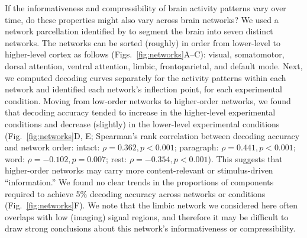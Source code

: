 \documentclass[english, 11pt]{article}
\begin{document}
If the informativeness and compressibility of brain activity patterns vary over
time, do these properties might also vary across brain networks? We used a
network parcellation identified by \cite{YeoEtal11} to segment the brain into
seven distinct networks. The networks can be sorted (roughly) in order from
lower-level to higher-level cortex as follows (Figs.~\ref{fig:networks}A--C):
visual, somatomotor, dorsal attention, ventral attention, limbic,
frontoparietal, and default mode. Next, we computed decoding curves separately
for the activity patterns within each network and identified each network's
inflection point, for each experimental condition. Moving from low-order
networks to higher-order networks, we found that decoding accuracy tended to
increase in the higher-level experimental conditions and decrease (slightly) in
the lower-level experimental conditions (Fig.~\ref{fig:networks}D, E;
Spearman's rank correlation between decoding accuracy and network order:
intact: $\rho = 0.362, p < 0.001$; paragraph: $\rho = 0.441, p < 0.001$; word:
$\rho = -0.102, p = 0.007$; rest: $\rho = -0.354, p < 0.001$). This suggests
that higher-order networks may carry more content-relevant or stimulus-driven
``information.'' We found no clear trends in the proportions of components
required to achieve 5\% decoding accuracy across networks or conditions
(Fig.~\ref{fig:networks}F). We note that the limbic network we considered here
often overlaps with low (imaging) signal regions, and therefore it may be
difficult to draw strong conclusions about this network's informativeness or
compressibility.
\end{document}
